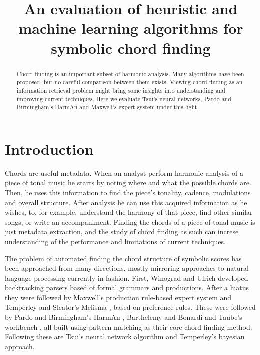 \documentclass{article}
\title{An evaluation of heuristic and machine learning algorithms for
  symbolic chord finding} \oneauthor {}{}
\newcommand{\comment}[1]{}
\begin{document}
\graphicspath{{figs/}{data/}}
\maketitle

\begin{abstract}
Chord finding is an important subset of harmonic analysis. Many
algorithms have been proposed, but no careful comparison between them
exists. Viewing chord finding as an information retrieval problem
might bring some insights into understanding and improving current
techniques. Here we evaluate Tsui's neural networks, Pardo and
Birmingham's HarmAn and Maxwell's expert system under this light.
\end{abstract}

\section{Introduction}
\label{sec:introduction}

\comment{
  ==> chord finding é importante, vários algoritmos propostos, poucas
  comparações 
  ==> revisar algoritmos
  ==> descrever artigo
}

Chords are useful metadata. When an analyst perform harmonic analysis
of a piece of tonal music he starts by noting where and what the
possible chords are. Then, he uses this information to find the
piece's tonality, cadence, modulations and overall structure. After
analysis he can use this acquired information as he wishes, to, for
example, understand the harmony of that piece, find other similar
songs, or write an accompaniment. Finding the chords of a piece of
tonal music is just metadata extraction, and the study of chord
finding as such can increse understanding of the performance and
limitations of current techniques.

The problem of automated finding the chord structure of symbolic
scores has been approached from many directions, mostly mirroring
approaches to natural language processing currently in fashion.
First, Winograd \cite{winograd:linguistics} and Ulrich
\cite{ulrich:analysis} developed backtracking parsers based of formal
grammars and productions. After a hiatus they were followed by
Maxwell's \cite{maxwell:expert} production rule-based expert system
and Temperley and Sleator's Melisma \cite{temperley.ea:modeling},
based on preference rules. These were followed by Pardo and
Birmingham's HarmAn \cite{pardo.ea:automated}, Barthelemy and Bonardi
\cite{barthelemy.ea:figured} and Taube's workbench
\cite{taube:automatic}, all built using pattern-matching as their core
chord-finding method. Following these are Tsui's \cite{tsui:harmonic}
neural network algorithm and Temperley's \cite{temperley:bayesian}
bayesian approach.
\end{document}
